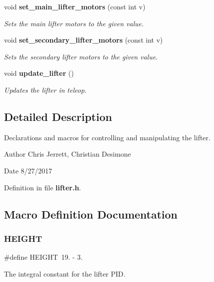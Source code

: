 \begin{DoxyCompactItemize}
void \textbf{ set\+\_\+main\+\_\+lifter\+\_\+motors} (const int v)
\begin{DoxyCompactList}\small\item\em Sets the main lifter motors to the given value. \end{DoxyCompactList}\item 
void \textbf{ set\+\_\+secondary\+\_\+lifter\+\_\+motors} (const int v)
\begin{DoxyCompactList}\small\item\em Sets the secondary lifter motors to the given value. \end{DoxyCompactList}\item 
void \textbf{ update\+\_\+lifter} ()
\begin{DoxyCompactList}\small\item\em Updates the lifter in teleop. \end{DoxyCompactList}\end{DoxyCompactItemize}


\subsection{Detailed Description}
Declarations and macros for controlling and manipulating the lifter. 

\begin{DoxyAuthor}{Author}
Chris Jerrett, Christian Desimone 
\end{DoxyAuthor}
\begin{DoxyDate}{Date}
8/27/2017 
\end{DoxyDate}


Definition in file \textbf{ lifter.\+h}.



\subsection{Macro Definition Documentation}
\mbox{\label{lifter_8h_aed89bd71aee8be823e8a20ec4e093c1e}} 
\subsubsection{H\+E\+I\+G\+HT}
{\footnotesize\ttfamily \#define H\+E\+I\+G\+HT~19. -\/ 3.}



The integral constant for the lifter P\+ID. 



